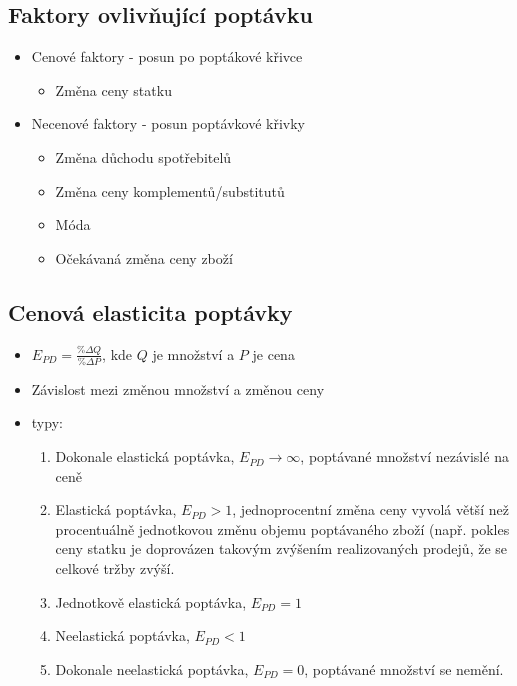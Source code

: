 \subsection{Faktory ovlivňující poptávku}
\begin{itemize}
    \item Cenové faktory - posun po poptákové křivce
    \begin{itemize}
        \item Změna ceny statku
    \end{itemize}
    \item Necenové faktory - posun poptávkové křivky
    \begin{itemize}
        \item Změna důchodu spotřebitelů
        \item Změna ceny komplementů/substitutů
        \item Móda
        \item Očekávaná změna ceny zboží
    \end{itemize}
\end{itemize}

\subsection{Cenová elasticita poptávky}
\begin{itemize}
    \item $E_{PD}=\frac{\%\Delta Q}{\%\Delta P}$, kde $Q$ je množství a $P$ je cena
    \item Závislost mezi změnou množství a změnou ceny
    \item typy:
    \begin{enumerate}
        \item Dokonale elastická poptávka, $E_{PD}\rightarrow \infty$, poptávané množství nezávislé na ceně
        \item Elastická poptávka, $E_{PD}>1$, jednoprocentní změna ceny vyvolá větší než procentuálně jednotkovou změnu objemu poptávaného zboží (např. pokles ceny statku je doprovázen takovým zvýšením realizovaných prodejů, že se celkové tržby zvýší.
        \item Jednotkově elastická poptávka, $E_{PD}=1$ 
        \item Neelastická poptávka, $E_{PD} < 1$
        \item Dokonale neelastická poptávka, $E_{PD}=0$, poptávané množství se nemění.
    \end{enumerate}
\end{itemize}

